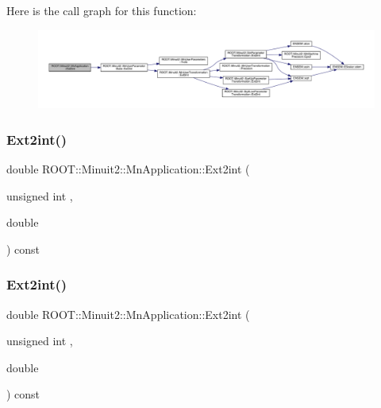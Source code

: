 Here is the call graph for this function\+:
\nopagebreak
\begin{figure}[H]
\begin{center}
\leavevmode
\includegraphics[width=350pt]{df/dd5/classROOT_1_1Minuit2_1_1MnApplication_a8c9379939f201ea95f32a2f1de575fca_cgraph}
\end{center}
\end{figure}
\mbox{\label{classROOT_1_1Minuit2_1_1MnApplication_a8c9379939f201ea95f32a2f1de575fca}} 
\subsubsection{\texorpdfstring{Ext2int()}{Ext2int()}\hspace{0.1cm}{\footnotesize\ttfamily [2/3]}}
{\footnotesize\ttfamily double R\+O\+O\+T\+::\+Minuit2\+::\+Mn\+Application\+::\+Ext2int (\begin{DoxyParamCaption}\item[{unsigned int}]{,  }\item[{double}]{ }\end{DoxyParamCaption}) const}

\mbox{\label{classROOT_1_1Minuit2_1_1MnApplication_a8c9379939f201ea95f32a2f1de575fca}} 
\subsubsection{\texorpdfstring{Ext2int()}{Ext2int()}\hspace{0.1cm}{\footnotesize\ttfamily [3/3]}}
{\footnotesize\ttfamily double R\+O\+O\+T\+::\+Minuit2\+::\+Mn\+Application\+::\+Ext2int (\begin{DoxyParamCaption}\item[{unsigned int}]{,  }\item[{double}]{ }\end{DoxyParamCaption}) const}

